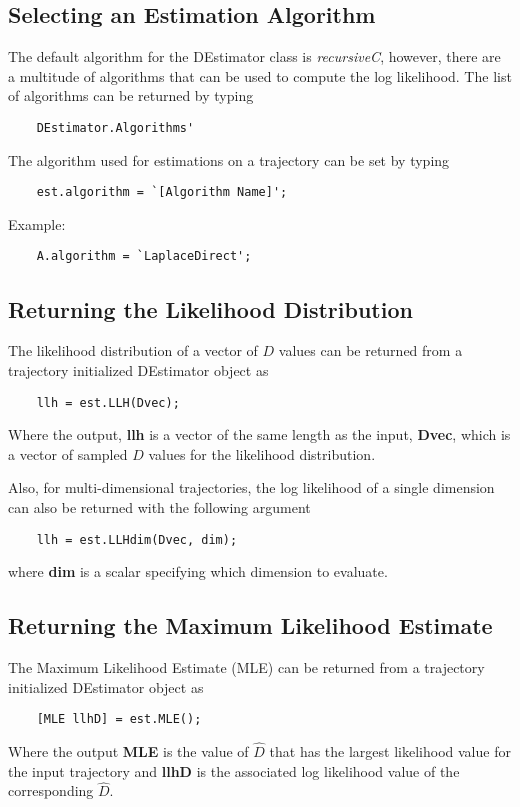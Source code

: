 \documentclass{article}
\begin{document}
\subsection{Selecting an Estimation Algorithm}
The default algorithm for the DEstimator class is \textit{recursiveC}, however, there are a multitude of algorithms that can be used to compute the log likelihood.  The list of algorithms can be returned by typing
\begin{verbatim}
    DEstimator.Algorithms'
\end{verbatim}
The algorithm used for estimations on a trajectory can be set by typing
\begin{verbatim}
    est.algorithm = `[Algorithm Name]';
\end{verbatim}

Example:
\begin{verbatim}
    A.algorithm = `LaplaceDirect';
\end{verbatim}

\subsection{Returning the Likelihood Distribution}
The likelihood distribution of a vector of $D$ values can be returned from a trajectory initialized DEstimator object as
\begin{verbatim}
    llh = est.LLH(Dvec);
\end{verbatim}
Where the output, \textbf{llh} is a vector of the same length as the input, \textbf{Dvec}, which is a vector of sampled $D$ values for the likelihood distribution.

Also, for multi-dimensional trajectories, the log likelihood of a single dimension can also be returned with the following argument
\begin{verbatim}
    llh = est.LLHdim(Dvec, dim);
\end{verbatim}
where \textbf{dim} is a scalar specifying which dimension to evaluate.

\subsection{Returning the Maximum Likelihood Estimate}
The Maximum Likelihood Estimate (MLE) can be returned from a trajectory initialized DEstimator object as
\begin{verbatim}
    [MLE llhD] = est.MLE();
\end{verbatim}
Where the output \textbf{MLE} is the value of $\hat{D}$ that has the largest likelihood value for the input trajectory and \textbf{llhD} is the associated log likelihood value of the corresponding $\hat{D}$.
\end{document}
